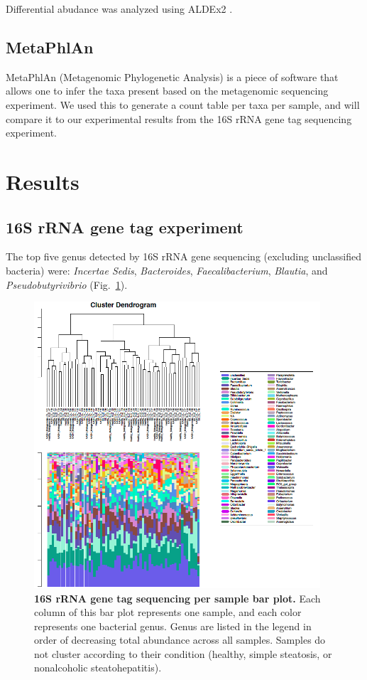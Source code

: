 Differential abudance was analyzed using ALDEx2 \cite{fernandes2014unifying}.

\subsection{MetaPhlAn}

MetaPhlAn (Metagenomic Phylogenetic Analysis) \cite{segata2012metagenomic} is a piece of software that allows one to infer the taxa present based on the metagenomic sequencing experiment. We used this to generate a count table per taxa per sample, and will compare it to our experimental results from the 16S rRNA gene tag sequencing experiment.

\section{Results}

\subsection{16S rRNA gene tag experiment}
The top five genus detected by 16S rRNA gene sequencing (excluding unclassified bacteria) were: \textit{Incertae Sedis}, \textit{Bacteroides}, \textit{Faecalibacterium}, \textit{Blautia}, and \textit{Pseudobutyrivibrio} (Fig.~\ref{nafld_16s_barplot}).

\begin{figure}[h]
\begin{center}
\includegraphics[width=0.95\textwidth]{16s_genus_barplot.png}
\caption{\textbf{16S rRNA gene tag sequencing per sample bar plot.} Each column of this bar plot represents one sample, and each color represents one bacterial genus. Genus are listed in the legend in order of decreasing total abundance across all samples. Samples do not cluster according to their condition (healthy, simple steatosis, or nonalcoholic steatohepatitis).}
\end{center}
\label{nafld_16s_barplot}
\end{figure}

